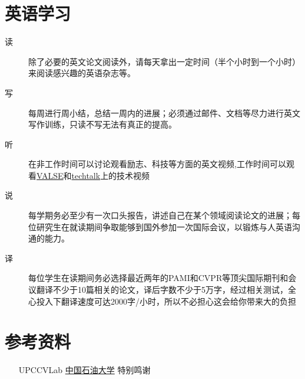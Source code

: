 \documentclass[a4paper，12pt]{article}
\begin{document}
\section{英语学习}

\begin{description}

\item[读] 除了必要的英文论文阅读外，请每天拿出一定时间（半个小时到一个小时）来阅读感兴趣的英语杂志等。

\item[写] 每周进行周小结，总结一周内的进展；必须通过邮件、文档等尽力进行英文写作训练，只读不写无法有真正的提高。

\item[听] 在非工作时间可以讨论观看励志、科技等方面的英文视频,工作时间可以观看\href{http://vision.ouc.edu.cn/valse/}{VALSE}和\href{http://techtalks.tv/}{techtalk}上的技术视频

\item[说] 每学期务必至少有一次口头报告，讲述自己在某个领域阅读论文的进展；每位研究生在就读期间争取能够到国外参加一次国际会议，以锻炼与人英语沟通的能力。

\item[译] 每位学生在读期间务必选择最近两年的PAMI和CVPR等顶尖国际期刊和会议翻译不少于10篇相关的论文，译后字数不少于5万字，经过相关测试，全心投入下翻译速度可达2000字/小时，所以不必担心这会给你带来大的负担

\end{description}



\section{参考资料}

\begin{itemize}
\item[UPCCVLab]\href{https://github.com/UPCCV/UPCCVLab}{中国石油大学} 特别鸣谢
\end{itemize}
\end{document}
